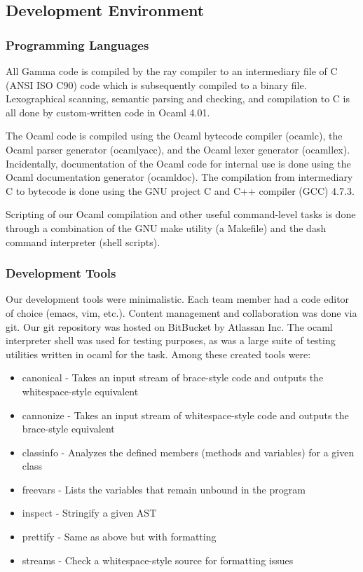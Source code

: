 \pagebreak 
\subsection*{Development Environment}

\subsubsection*{Programming Languages}
All Gamma code is compiled by the ray compiler to an intermediary file of C (ANSI ISO C90) code which is subsequently compiled to a binary file. Lexographical scanning, semantic parsing and checking, and compilation to C is all done by custom-written code in Ocaml 4.01.

The Ocaml code is compiled using the Ocaml bytecode compiler (ocamlc), the Ocaml parser generator (ocamlyacc), and the Ocaml lexer generator (ocamllex). Incidentally, documentation of the Ocaml code for internal use is done using the Ocaml documentation generator (ocamldoc). The compilation from intermediary C to bytecode is done using the GNU project C and C++ compiler (GCC) 4.7.3.

Scripting of our Ocaml compilation and other useful command-level tasks is done through a combination of the GNU make utility (a Makefile) and the dash command interpreter (shell scripts).

\subsubsection*{Development Tools}
Our development tools were minimalistic. Each team member had a code editor of choice (emacs, vim, etc.). Content management and collaboration was done via git. Our git repository was hosted on BitBucket by Atlassan Inc. The ocaml interpreter shell was used for testing purposes, as was a large suite of testing utilities written in ocaml for the task. Among these created tools were:
\begin{itemize}
\item canonical - Takes an input stream of brace-style code and outputs the whitespace-style equivalent
\item cannonize - Takes an input stream of whitespace-style code and outputs the brace-style equivalent
\item classinfo - Analyzes the defined members (methods and variables) for a given class
\item freevars - Lists the variables that remain unbound in the program
\item inspect - Stringify a given AST
\item prettify - Same as above but with formatting
\item streams - Check a whitespace-style source for formatting issues
\end{itemize}